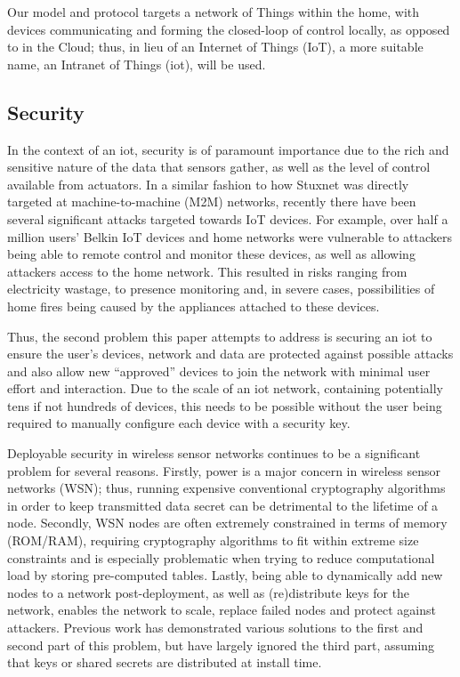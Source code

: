 \documentclass[conference]{./sty/IEEEtran}
\begin{document}
Our model and protocol targets a network of Things within the home, with devices communicating and forming the closed-loop of control locally, as opposed to in the Cloud; thus, in lieu of an Internet of Things (IoT), a more suitable name, an Intranet of Things (iot), will be used.

\subsection{Security} %
\label{sub:motivation_security}
In the context of an iot, security is of paramount importance due to the rich and sensitive nature of the data that sensors gather, as well as the level of control available from actuators. In a similar fashion to how Stuxnet was directly targeted at machine-to-machine (M2M) networks\cite{Stuxnet}, recently there have been several significant attacks targeted towards IoT devices\cite{IoTWorm,BelkinWemo}. For example, over half a million users' Belkin IoT devices and home networks were vulnerable to attackers being able to remote control and monitor these devices, as well as allowing attackers access to the home network\cite{BelkinWemo}. This resulted in risks ranging from electricity wastage, to presence monitoring and, in severe cases, possibilities of home fires being caused by the appliances attached to these devices.

Thus, the second problem this paper attempts to address is securing an iot to ensure the user's devices, network and data are protected against possible attacks and also allow new ``approved'' devices to join the network with minimal user effort and interaction. Due to the scale of an iot network, containing potentially tens if not hundreds of devices, this needs to be possible without the user being required to manually configure each device with a security key.

Deployable security in wireless sensor networks continues to be a significant problem for several reasons. Firstly, power is a major concern in wireless sensor networks (WSN); thus, running expensive conventional cryptography algorithms in order to keep transmitted data secret can be detrimental to the lifetime of a node. Secondly, WSN nodes are often extremely constrained in terms of memory (ROM/RAM), requiring cryptography algorithms to fit within extreme size constraints and is especially problematic when trying to reduce computational load by storing pre-computed tables. Lastly, being able to dynamically add new nodes to a network post-deployment, as well as (re)distribute keys for the network, enables the network to scale, replace failed nodes and protect against attackers. Previous work has demonstrated various solutions to the first and second part of this problem\cite{TinySec,MiniSec,TinyECC}, but have largely ignored the third part, assuming that keys or shared secrets are distributed at install time.
\end{document}
